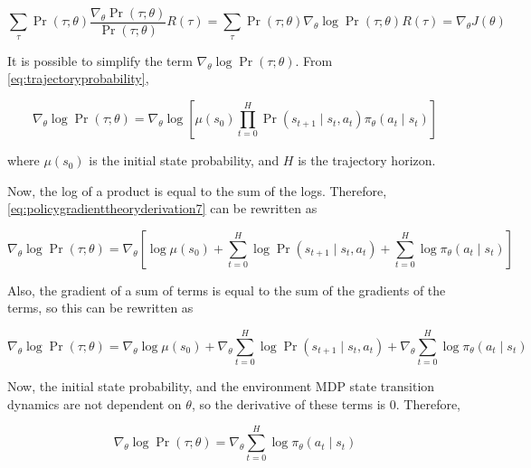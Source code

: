\documentclass[acmlarge,screen]{acmart}
\begin{document}
\begin{equation}
  \sum_{\tau} \Pr (\tau; \theta) \frac{\nabla_\theta \Pr (\tau; \theta)}{\Pr (\tau; \theta)} R(\tau) = \sum_{\tau} \Pr (\tau; \theta) \nabla_\theta \log \Pr (\tau; \theta) R(\tau) = \nabla_\theta J(\theta)
\label{eq:policygradienttheoryderivation6}
\end{equation}








It is possible to simplify the term $\nabla_\theta \log \Pr (\tau; \theta)$.
From \ref{eq:trajectoryprobability},

\begin{equation}
  \nabla_\theta \log \Pr (\tau; \theta) = \nabla_\theta \log \left[ \mu(s_0) \prod_{t=0}^H  \Pr(s_{t+1} \mid s_t, a_t) \pi_\theta (a_t \mid s_t)   \right]    
\label{eq:policygradienttheoryderivation7}
\end{equation}

\noindent where $\mu(s_0)$ is the initial state probability, and $H$ is the trajectory horizon.

Now, the log of a product is equal to the sum of the logs.  Therefore, \ref{eq:policygradienttheoryderivation7} can be rewritten as

\begin{equation}
  \nabla_\theta \log \Pr (\tau; \theta) = \nabla_\theta \left[ \log \mu(s_0) + \sum_{t=0}^H \log \Pr(s_{t+1} \mid s_t, a_t) + \sum_{t=0}^H \log \pi_\theta (a_t \mid s_t)  \right]
\label{eq:policygradienttheoryderivation8}
\end{equation}

\noindent Also, the gradient of a sum of terms is equal to the sum of the gradients of the terms, so this can be rewritten as

\begin{equation}
  \nabla_\theta \log \Pr (\tau; \theta) = \nabla_\theta \log \mu(s_0) + \nabla_\theta \sum_{t=0}^H \log \Pr(s_{t+1} \mid s_t, a_t) + \nabla_\theta \sum_{t=0}^H \log \pi_\theta (a_t \mid s_t)
\label{eq:policygradienttheoryderivation9}
\end{equation}

\noindent Now, the initial state probability, and the environment MDP state transition dynamics are not dependent on $\theta$, so the derivative of these terms is 0.
Therefore,

\begin{equation}
  \nabla_\theta \log \Pr (\tau; \theta) =  \nabla_\theta \sum_{t=0}^H \log \pi_\theta (a_t \mid s_t)
\label{eq:policygradienttheoryderivation10}
\end{equation}
\end{document}
